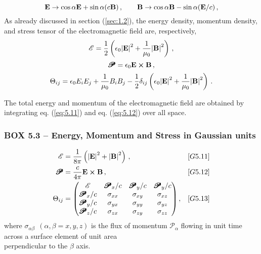 \begin{equation}\label{eq:5.10}
\vb{E} \rightarrow \cos\alpha \vb{E} + \sin\alpha (c \vb{B})\,, \quad\quad \vb{B} \rightarrow \cos\alpha \vb{B} - \sin\alpha ( \vb{E}/c)\,,
\end{equation}
As already discussed in section (\ref{sec:1.2}), the energy density, momentum density, and stress tensor of the electromagnetic field are, respectively,
\begin{equation}\label{eq:5.11}
\mathscr{E} = \frac{1}{2} \left(\epsilon_0 \abs{\vb{E}}^2 + \frac{1}{\mu_0} \abs{\vb{B}}^2 \right)\,,  
\end{equation}
\begin{equation}\label{eq:5.12}
\pmb{\mathscr{P}} = \epsilon_0 \vb{E} \cross \vb{B}\,,
\end{equation}
\begin{equation}\label{eq:5.13}
\Theta_{ij} = \epsilon_{0} E_i E_j + \frac{1}{\mu_0} B_i B_j  -\frac{1}{2} \delta_{ij} \left(\epsilon_0 \abs{\vb{E}}^2 + \frac{1}{\mu_0} \abs{\vb{B}}^2 \right)   \,.
\end{equation}

The total energy and momentum of the electromagnetic field are obtained by integrating eq. (\ref{eq:5.11}) and eq. (\ref{eq:5.12}) over all space.


\parindent=0pt  %
\parbox{\textwidth}{\begin{mdframed}[style=MyFrame] %
\subsubsection*{BOX 5.3 -- Energy, Momentum and Stress in Gaussian units}\label{box:8.3}
\begin{align*}
\mathscr{E} &= \frac{1}{8 \pi} \left(\abs{\vb{E}}^2 + \abs{\vb{B}}^2 \right)\,,\quad\quad\quad &[G5.11]\\ 
\pmb{\mathscr{P}} &= \frac{c}{4 \pi} \vb{E} \cross \vb{B}\,, &[G5.12]\\
\Theta_{ij} &= \mqty( \mathscr{E} &\pmb{\mathscr{P}}_x/c &\pmb{\mathscr{P}}_y/c &\pmb{\mathscr{P}}_y/c\\ 
                      \pmb{\mathscr{P}}_x/c &\sigma_{xx} &\sigma_{xy} &\sigma_{xz}\\
                      \pmb{\mathscr{P}}_y/c &\sigma_{yx} &\sigma_{yy} &\sigma_{yz}\\
                      \pmb{\mathscr{P}}_z/c &\sigma_{zx} &\sigma_{zy} &\sigma_{zz})\,, &[G5.13]
\end{align*}
where $\sigma_{\alpha \beta}\:\: (\alpha, \beta = x, y, z)$  is the flux of momentum  
$\pmb{\mathscr{P}}_\alpha$ flowing in unit time across a surface element of unit area\\ perpendicular to the $\beta$  axis.
\end{mdframed}} %
\parindent=10pt %




